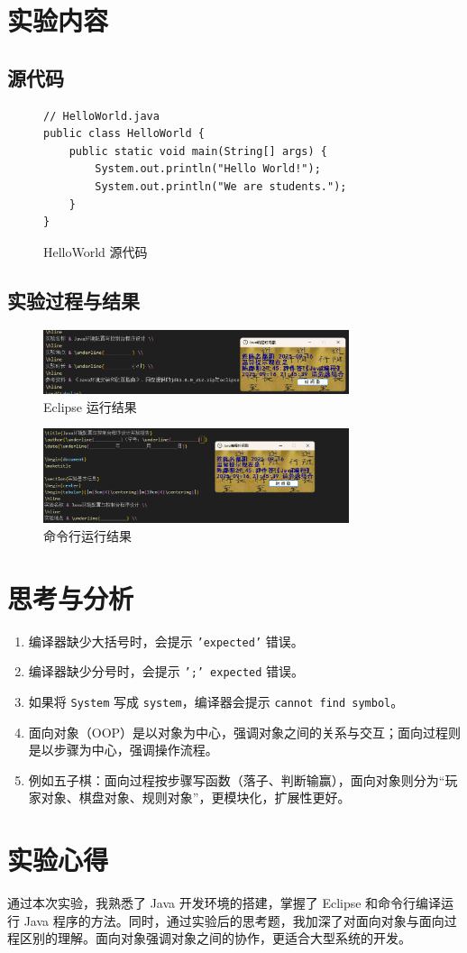\documentclass[12pt,a4paper]{article}
\begin{document}
\section*{实验内容}

\subsection*{源代码}
\begin{figure}[H]
\centering
\begin{lstlisting}
// HelloWorld.java
public class HelloWorld {
    public static void main(String[] args) {
        System.out.println("Hello World!");
        System.out.println("We are students.");
    }
}
\end{lstlisting}
\caption{HelloWorld 源代码}
\end{figure}

\subsection*{实验过程与结果}

\begin{figure}[H]
\centering
\includegraphics[width=0.8\textwidth]{eclipse_result.png}
\caption{Eclipse 运行结果}
\end{figure}

\begin{figure}[H]
\centering
\includegraphics[width=0.8\textwidth]{cmd_result.png}
\caption{命令行运行结果}
\end{figure}

\section*{思考与分析}
\begin{enumerate}
    \item 编译器缺少大括号时，会提示 \texttt{'expected'} 错误。
    \item 编译器缺少分号时，会提示 \texttt{';' expected} 错误。
    \item 如果将 \texttt{System} 写成 \texttt{system}，编译器会提示 \texttt{cannot find symbol}。
    \item 面向对象（OOP）是以对象为中心，强调对象之间的关系与交互；面向过程则是以步骤为中心，强调操作流程。  
    \item 例如五子棋：面向过程按步骤写函数（落子、判断输赢），面向对象则分为“玩家对象、棋盘对象、规则对象”，更模块化，扩展性更好。
\end{enumerate}

\section*{实验心得}
通过本次实验，我熟悉了 Java 开发环境的搭建，掌握了 Eclipse 和命令行编译运行 Java 程序的方法。同时，通过实验后的思考题，我加深了对面向对象与面向过程区别的理解。面向对象强调对象之间的协作，更适合大型系统的开发。
\end{document}
